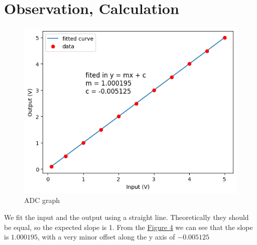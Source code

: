 \section{Observation, Calculation}
	

	\begin{figure}[h]
		\centering
		\includegraphics[width=0.8\columnwidth]{images/graph.png}
		\caption{ADC graph}
		\label{graph}
	\end{figure}

	We fit the input and the output using a straight line. Theoretically they should be equal, so the expected slope is 1. From the \hyperref[graph]{Figure 4} we can see that the slope is $1.000195$, with a very minor offset along the y axis of $-0.005125$

